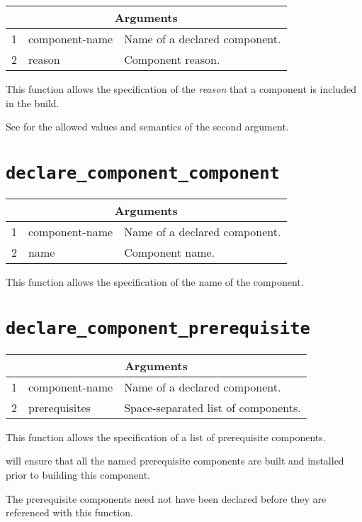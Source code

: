 \begin{tabularx}{\linewidth}{ll|X}
  \multicolumn{3}{c}{\textbf{Arguments}} \\ \hline

  1 & component-name & Name of a declared component. \\
  2 & reason & Component reason.
\end{tabularx}

This function allows the specification of the \emph{reason} that a
component is included in the build.

See  for the allowed values and semantics of
the second argument.

\section{\texttt{declare\_component\_component}}\label{api:component}

\begin{tabularx}{\linewidth}{ll|X}
  \multicolumn{3}{c}{\textbf{Arguments}} \\ \hline

  1 & component-name & Name of a declared component. \\
  2 & name & Component name.
\end{tabularx}

This function allows the specification of the name of the component.

\section{\texttt{declare\_component\_prerequisite}}\label{api:prerequisite}

\begin{tabularx}{\linewidth}{ll|X}
  \multicolumn{3}{c}{\textbf{Arguments}} \\ \hline

  1 & component-name & Name of a declared component. \\
  2 & prerequisites & Space-separated list of components.
\end{tabularx}

This function allows the specification of a list of prerequisite
components.

\lmsbw will ensure that all the named prerequisite components are
built and installed prior to building this component.

The prerequisite components need not have been declared before they
are referenced with this function.

